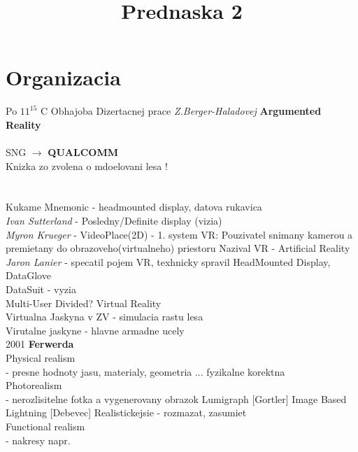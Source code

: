 \documentclass[]{article}
\title{Prednaska 2}
\author{}
\begin{document}
\maketitle


\section{Organizacia}

Po $11^{15}$ C Obhajoba Dizertacnej prace \textit{Z.Berger-Haladovej} \textbf{Argumented Reality} \\ \\
SNG $\rightarrow$ \textbf{QUALCOMM} \\
Knizka zo zvolena o mdoelovani lesa ! \\

\section{}
\begin{flushleft}
Kukame Mnemonic - headmounted display, datova rukavica \\

\textit{Ivan Sutterland} - Posledny/Definite display (vizia)\\

\textit{Myron Krueger} - VideoPlace(2D) - 1. system VR:{
	Pouzivatel snimany kamerou a premietany do obrazoveho(virtualneho) priestoru
	Nazival VR - Artificial Reality
}\\

\textit{Jaron Lanier} - specatil pojem VR, texhnicky spravil HeadMounted Display, DataGlove\\

DataSuit - vyzia \\

Multi-User Divided? Virtual Reality \\

Virtualna Jaskyna v ZV - simulacia rastu lesa \\
Virutalne jaskyne - hlavne armadne ucely \\

2001 \textbf{Ferwerda} \\
Physical realism \\
	- presne hodnoty jasu, materialy, geometria ... fyzikalne korektna \\
Photorealism \\
	- nerozlisitelne fotka a vygenerovany obrazok
	Lumigraph [Gortler]
	Image Based Lightning [Debevec]
	Realistickejsie - rozmazat, zasumiet \\
Functional realism \\
	- nakresy napr. \\

	


\end{flushleft}
\end{document}
